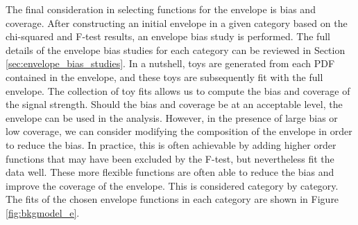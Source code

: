 The final consideration in selecting functions for the envelope is bias and coverage. After constructing an initial envelope in a given 
category based on the chi-squared and F-test results, an envelope bias study is performed. The full details of the envelope 
bias studies for each category can be reviewed in Section \ref{sec:envelope_bias_studies}. In a nutshell, toys are generated from 
each PDF contained in the envelope, and these toys are subsequently fit with the full envelope. The collection of toy fits
allows us to compute the bias and coverage of the signal strength. Should the bias and coverage be at an acceptable level, the 
envelope can be used in the analysis. However, in the presence of large bias or low coverage, we can consider modifying the 
composition of the envelope in order to reduce the bias. In practice, this is often achievable by adding higher order functions that 
may have been excluded by the F-test, but nevertheless fit the data well. These more flexible functions are often able to reduce the 
bias and improve the coverage of the envelope. This is considered category by category.
The fits of the chosen envelope functions in each category are shown in Figure \ref{fig:bkgmodel_e}.

